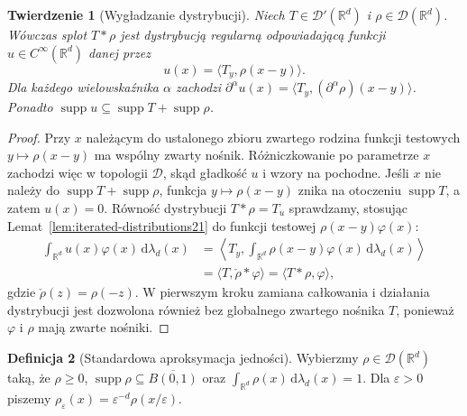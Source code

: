 \documentclass[11pt,a4paper]{article}
\numberwithin{equation}{section}
\theoremstyle{plain}
\newtheorem{twierdzenie}{Twierdzenie}[section]
\theoremstyle{definition}
\newtheorem{definicja}[twierdzenie]{Definicja}
\theoremstyle{remark}
\newcommand{\R}{\mathbb R}
\DeclareMathOperator{\supp}{supp}
\begin{document}
\begin{twierdzenie}[Wygładzanie dystrybucji]
\label{thm:smoothing21}
Niech $T\in\mathcal D'(\R^d)$ i
$\rho\in\mathcal D(\R^d)$. Wówczas splot
$T*\rho$ jest dystrybucją regularną odpowiadającą
funkcji $u\in C^\infty(\R^d)$ danej przez
\[
 u(x)=\langle T_y,\rho(x-y)\rangle.
\]
Dla każdego wielowskaźnika $\alpha$ zachodzi
$\partial^\alpha u(x)
=\langle T_y,(\partial^\alpha\rho)(x-y)\rangle$.
Ponadto $\supp u\subseteq\supp T+\supp\rho$.
\end{twierdzenie}
\begin{proof}
Przy $x$ należącym do ustalonego zbioru zwartego
rodzina funkcji testowych $y\mapsto\rho(x-y)$
ma wspólny zwarty nośnik. Różniczkowanie po parametrze
$x$ zachodzi więc w topologii $\mathcal D$, skąd
gładkość $u$ i wzory na pochodne. Jeśli $x$
nie należy do $\supp T+\supp\rho$, funkcja
$y\mapsto\rho(x-y)$ znika na otoczeniu $\supp T$,
a zatem $u(x)=0$. Równość dystrybucji $T*\rho=T_u$
sprawdzamy, stosując Lemat~\ref{lem:iterated-distributions21}
do funkcji testowej $\rho(x-y)\varphi(x)$:
\[
 \begin{aligned}
 \int_{\R^d}u(x)\varphi(x)\,\mathrm d\lambda_d(x)
 &=\left\langle T_y,
      \int_{\R^d}\rho(x-y)\varphi(x)\,\mathrm d\lambda_d(x)
   \right\rangle\\
 &=\langle T,\check\rho*\varphi\rangle
 =\langle T*\rho,\varphi\rangle,
 \end{aligned}
\]
gdzie $\check\rho(z)=\rho(-z)$. W pierwszym
kroku zamiana całkowania i działania dystrybucji
jest dozwolona również bez globalnego zwartego nośnika
$T$, ponieważ $\varphi$ i $\rho$ mają zwarte nośniki.
\end{proof}

\begin{definicja}[Standardowa aproksymacja jedności]
\label{def:mollifier21}
Wybierzmy $\rho\in\mathcal D(\R^d)$ taką, że
$\rho\ge0$, $\supp\rho\subseteq\overline{B(0,1)}$
oraz $\int_{\R^d}\rho(x)\,\mathrm d\lambda_d(x)=1$.
Dla $\varepsilon>0$ piszemy
$\rho_\varepsilon(x)=\varepsilon^{-d}\rho(x/\varepsilon)$.
\end{definicja}
\end{document}
